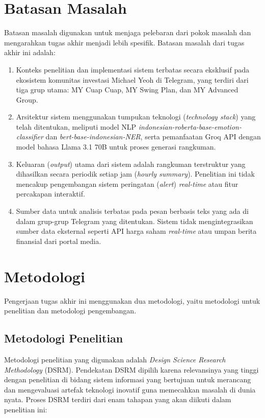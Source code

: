 \section{Batasan Masalah}
Batasan masalah digunakan untuk menjaga pelebaran dari pokok masalah dan mengarahkan tugas akhir menjadi lebih spesifik. Batasan masalah dari tugas akhir ini adalah:

\begin{enumerate}
\item Konteks penelitian dan implementasi sistem terbatas secara eksklusif pada ekosistem komunitas investasi Michael Yeoh di Telegram, yang terdiri dari tiga grup utama: MY Cuap Cuap, MY Swing Plan, dan MY Advanced Group.
\item Arsitektur sistem menggunakan tumpukan teknologi (\textit{technology stack}) yang telah ditentukan, meliputi model NLP \textit{indonesian-roberta-base-emotion-classifier} dan \textit{bert-base-indonesian-NER}, serta pemanfaatan Groq API dengan model bahasa Llama 3.1 70B untuk proses generasi rangkuman.
\item Keluaran (\textit{output}) utama dari sistem adalah rangkuman terstruktur yang dihasilkan secara periodik setiap jam (\textit{hourly summary}). Penelitian ini tidak mencakup pengembangan sistem peringatan (\textit{alert}) \textit{real-time} atau fitur percakapan interaktif.
\item Sumber data untuk analisis terbatas pada pesan berbasis teks yang ada di dalam grup-grup Telegram yang ditentukan. Sistem tidak mengintegrasikan sumber data eksternal seperti API harga saham \textit{real-time} atau umpan berita finansial dari portal media.
\end{enumerate}

\section{Metodologi}
Pengerjaan tugas akhir ini menggunakan dua metodologi, yaitu metodologi untuk penelitian dan metodologi pengembangan.

\subsection{Metodologi Penelitian}
Metodologi penelitian yang digunakan adalah \textit{Design Science Research Methodology} (DSRM). Pendekatan DSRM dipilih karena relevansinya yang tinggi dengan penelitian di bidang sistem informasi yang bertujuan untuk merancang dan mengevaluasi artefak teknologi inovatif guna memecahkan masalah di dunia nyata. Proses DSRM terdiri dari enam tahapan yang akan diikuti dalam penelitian ini:

